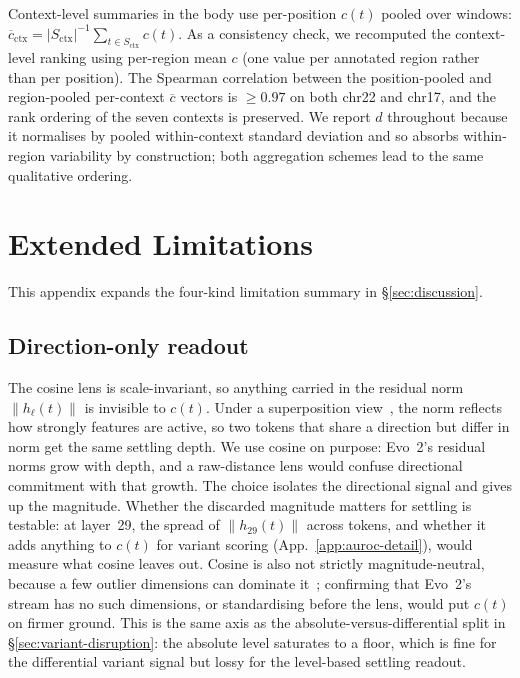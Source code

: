 \documentclass{article}
\theoremstyle{plain}
\theoremstyle{definition}
\theoremstyle{remark}
\begin{document}
Context-level summaries in the body use per-position $c(t)$ pooled over
windows: $\overline{c}_{\mathrm{ctx}}\!=\!|S_{\mathrm{ctx}}|^{-1}\sum_{t\in
S_{\mathrm{ctx}}} c(t)$. As a consistency check, we recomputed the
context-level ranking using per-region mean $c$ (one value per
annotated region rather than per position). The Spearman correlation
between the position-pooled and region-pooled per-context $\overline{c}$
vectors is $\ge 0.97$ on both chr22 and chr17, and the rank ordering
of the seven contexts is preserved. We report $d$ throughout because
it normalises by pooled within-context standard deviation and so
absorbs within-region variability by construction; both aggregation
schemes lead to the same qualitative ordering.

\section{Extended Limitations}
\label{app:extended-limitations}

This appendix expands the four-kind limitation summary in
\S\ref{sec:discussion}.

\subsection{Direction-only readout}
\label{app:lim-magnitude}
The cosine lens is scale-invariant, so anything carried in the residual
norm $\lVert h_\ell(t)\rVert$ is invisible to $c(t)$. Under a
superposition view~\cite{elhage2022toy,bricken2023monosemanticity}, the
norm reflects how strongly features are active, so two tokens that share
a direction but differ in norm get the same settling depth. We use
cosine on purpose: Evo~2's residual norms grow with depth, and a
raw-distance lens would confuse directional commitment with that
growth. The choice isolates the directional signal and gives up the
magnitude. Whether the discarded magnitude matters for settling is
testable: at layer~29, the spread of $\lVert h_{29}(t)\rVert$ across
tokens, and whether it adds anything to $c(t)$ for variant scoring
(App.~\ref{app:auroc-detail}), would measure what cosine leaves out.
Cosine is also not strictly magnitude-neutral, because a few outlier
dimensions can dominate it~\cite{timkey2021rogue}; confirming that
Evo~2's stream has no such dimensions, or standardising before the
lens, would put $c(t)$ on firmer ground. This is the same axis as the
absolute-versus-differential split in \S\ref{sec:variant-disruption}:
the absolute level saturates to a floor, which is fine for the
differential variant signal but lossy for the level-based settling
readout.
\end{document}
